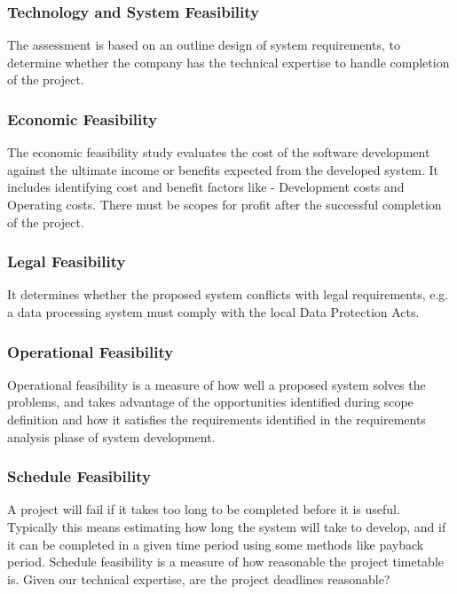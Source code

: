 \documentclass[12pt, a4paper]{report}
\begin{document}
    \subsubsection{Technology and System Feasibility}
    The assessment is based on an outline design of system requirements, to determine whether the company has the technical expertise to handle completion of the project.
  
    \subsubsection{Economic Feasibility}
    The economic feasibility study evaluates the cost of the software development against the ultimate income or benefits expected from the developed system. It includes identifying cost and benefit factors like - Development costs and Operating costs. There must be scopes for profit after the successful completion of the project.
  
    \subsubsection{Legal Feasibility}
    It determines whether the proposed system conflicts with legal requirements, e.g. a data processing system must comply with the local Data Protection Acts.
  
    \subsubsection{Operational Feasibility}
    Operational feasibility is a measure of how well a proposed system solves the problems, and takes advantage of the opportunities identified during scope definition and how it satisfies the requirements identified in the requirements analysis phase of system development.
  
    \subsubsection{Schedule Feasibility}
    A project will fail if it takes too long to be completed before it is useful. Typically this means estimating how long the system will take to develop, and if it can be completed in a given time period using some methods like payback period. Schedule feasibility is a measure of how reasonable the project timetable is. Given our technical expertise, are the project deadlines reasonable?
    
\end{document}
